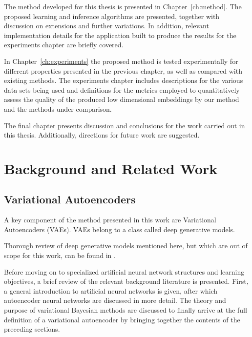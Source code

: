 The method developed for this thesis is presented in Chapter~\ref{ch:method}. The proposed learning and inference algorithms are presented, together with discussion on extensions and further variations. In addition, relevant implementation details for the application built to produce the results for the experiments chapter are briefly covered.

In Chapter~\ref{ch:experiments} the proposed method is tested experimentally for different properties presented in the previous chapter, as well as compared with existing methods. The experiments chapter includes descriptions for the various data sets being used and definitions for the metrics employed to quantitatively assess the quality of the produced low dimensional embeddings by our method and the methods under comparison.

The final chapter presents discussion and conclusions for the work carried out in this thesis. Additionally, directions for future work are suggested.

\chapter{Background and Related Work}
\label{ch:background_and_related_work}

\section{Variational Autoencoders}
\label{section:variational_autoencoders}

A key component of the method presented in this work are Variational Autoencoders (VAEs). VAEs belong to a class called deep generative models. 


Thorough review of deep generative models mentioned here, but which are out of scope for this work, can be found in \cite[Chapter~20]{deep_learning_book}.

Before moving on to specialized artificial neural network structures and learning objectives, a brief review of the relevant background literature is presented. First, a general introduction to artificial neural networks is given, after which autoencoder neural networks are discussed in more detail. The theory and purpose of variational Bayesian methods are discussed to finally arrive at the full definition of a variational autoencoder by bringing together the contents of the preceding sections.

